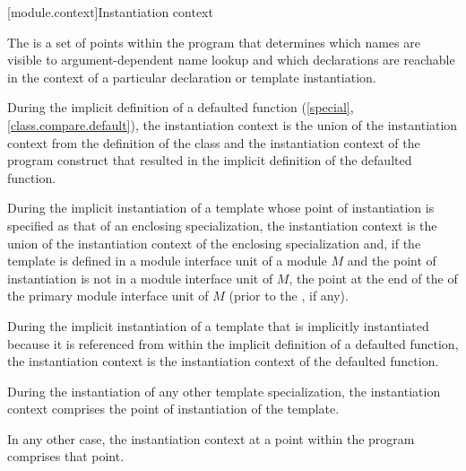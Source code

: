 [module.context]{Instantiation context}

\pnum
The  is a set of points within the program
that determines which names are visible
to argument-dependent name lookup
and which declarations are reachable
in the context of a particular declaration or template instantiation.

\pnum
During the implicit definition of
a defaulted function (\ref{special}, \ref{class.compare.default}),
the instantiation context is the union of
the instantiation context from the definition of the class and
the instantiation context of the program construct that
resulted in the implicit definition of the defaulted function.

\pnum
During the implicit instantiation of a template
whose point of instantiation is specified as
that of an enclosing specialization,
the instantiation context is the union of
the instantiation context of the enclosing specialization and,
if the template is defined in a module interface unit of a module $M$
and the point of instantiation is not in a module interface unit of $M$,
the point at the end of the
 of the
primary module interface unit of $M$
(prior to the , if any).

\pnum
During the implicit instantiation of a template
that is implicitly instantiated because it is referenced
from within the implicit definition of a defaulted function,
the instantiation context is the instantiation context of
the defaulted function.

\pnum
During the instantiation of any other template specialization,
the instantiation context comprises the point of instantiation
of the template.

\pnum
In any other case, the instantiation context
at a point within the program
comprises that point.

